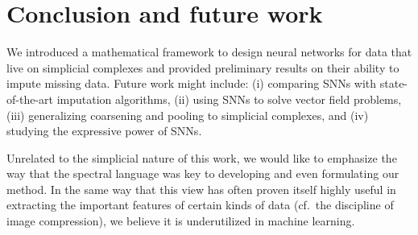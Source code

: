 \section{Conclusion and future work}

We introduced a mathematical framework to design neural networks for data that live on simplicial complexes and provided preliminary results on their ability to impute missing data.
Future work might include: (i) comparing SNNs with state-of-the-art imputation algorithms, (ii) using SNNs to solve vector field problems, (iii) generalizing coarsening and pooling to simplicial complexes, and (iv) studying the expressive power of SNNs.

Unrelated to the simplicial nature of this work, we would like to emphasize the way that the spectral language was key to developing and even formulating our method. In the same way that this view has often proven itself highly useful in extracting the important features of certain kinds of data (cf.\ the discipline of image compression), we believe it is underutilized in machine learning.
